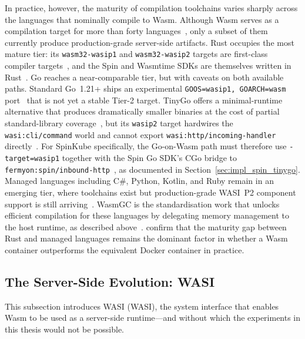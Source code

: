\begin{sloppypar}
In practice, however, the maturity of compilation toolchains varies sharply across the languages that nominally compile to \acs{Wasm}. Although \acs{Wasm} serves as a compilation target for more than forty languages~\cite{fermyon2024langmatrix}, only a subset of them currently produce production-grade server-side artifacts. Rust occupies the most mature tier: its \texttt{wasm32-wasip1} and \texttt{wasm32-wasip2} targets are first-class compiler targets~\cite{rustblogwasip2}, and the Spin and Wasmtime \acsp{SDK} are themselves written in Rust~\cite{spinframework2024rust, bytecodealliance2024wasmtime}. Go reaches a near-comparable tier, but with caveats on both available paths. Standard Go~1.21+ ships an experimental \texttt{GOOS=wasip1, GOARCH=wasm} port~\cite{goblogwasi2024} that is not yet a stable Tier-2 target. TinyGo offers a minimal-runtime alternative that produces dramatically smaller binaries at the cost of partial standard-library coverage~\cite{tinygo2024}, but its \texttt{wasip2} target hardwires the \texttt{wasi:cli/command} world and cannot export \texttt{wasi:http/incoming-handler} directly~\cite{tinygo2024, bytecodealliance2024componentmodel}. For SpinKube specifically, the Go-on-Wasm path must therefore use \texttt{-target=wasip1} together with the Spin Go \acs{SDK}'s \acs{CGo} bridge to \texttt{fermyon:spin/inbound-http}~\cite{spinframework2024go}, as documented in Section~\ref{sec:impl_spin_tinygo}. Managed languages including C\#, Python, Kotlin, and Ruby remain in an emerging tier, where toolchains exist but production-grade \acs{WASI}~P2 component support is still arriving~\cite{fermyon2024langmatrix, chiarlone2024serverside}. \acs{WasmGC} is the standardisation work that unlocks efficient compilation for these languages by delegating memory management to the host runtime, as described above~\cite{wasm2023gcproposal, steiner2023wasmgc}. \textcite{liu2025wasmcontainer} confirm that the maturity gap between Rust and managed languages remains the dominant factor in whether a \acs{Wasm} container outperforms the equivalent Docker container in practice.
\end{sloppypar}

\subsection{The Server-Side Evolution: WASI}
This subsection introduces \acl{WASI} (\acs{WASI}), the system interface that enables \acs{Wasm} to be used as a server-side runtime---and without which the experiments in this thesis would not be possible.

